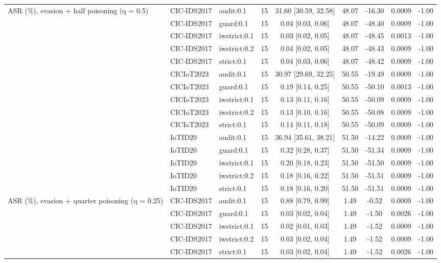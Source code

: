 \begin{table}[t]
\begin{tabular}{lllcccccc}
ASR (\%), evasion + half poisoning (q = 0.5) & CIC-IDS2017 & audit:0.1 & 15 & 31.60 [30.59, 32.58] & 48.07 & -16.30 & 0.0009 & -1.00 \\
 & CIC-IDS2017 & guard:0.1 & 15 & 0.04 [0.03, 0.06] & 48.07 & -48.40 & 0.0009 & -1.00 \\
 & CIC-IDS2017 & iwstrict:0.1 & 15 & 0.03 [0.02, 0.05] & 48.07 & -48.45 & 0.0013 & -1.00 \\
 & CIC-IDS2017 & iwstrict:0.2 & 15 & 0.04 [0.02, 0.05] & 48.07 & -48.43 & 0.0009 & -1.00 \\
 & CIC-IDS2017 & strict:0.1 & 15 & 0.04 [0.03, 0.06] & 48.07 & -48.42 & 0.0009 & -1.00 \\
 & CICIoT2023 & audit:0.1 & 15 & 30.97 [29.69, 32.25] & 50.55 & -19.49 & 0.0009 & -1.00 \\
 & CICIoT2023 & guard:0.1 & 15 & 0.19 [0.14, 0.25] & 50.55 & -50.10 & 0.0013 & -1.00 \\
 & CICIoT2023 & iwstrict:0.1 & 15 & 0.13 [0.11, 0.16] & 50.55 & -50.09 & 0.0009 & -1.00 \\
 & CICIoT2023 & iwstrict:0.2 & 15 & 0.13 [0.10, 0.16] & 50.55 & -50.08 & 0.0009 & -1.00 \\
 & CICIoT2023 & strict:0.1 & 15 & 0.14 [0.11, 0.18] & 50.55 & -50.09 & 0.0009 & -1.00 \\
 & IoTID20 & audit:0.1 & 15 & 36.94 [35.61, 38.21] & 51.50 & -14.22 & 0.0009 & -1.00 \\
 & IoTID20 & guard:0.1 & 15 & 0.32 [0.28, 0.37] & 51.50 & -51.34 & 0.0009 & -1.00 \\
 & IoTID20 & iwstrict:0.1 & 15 & 0.20 [0.18, 0.23] & 51.50 & -51.50 & 0.0009 & -1.00 \\
 & IoTID20 & iwstrict:0.2 & 15 & 0.18 [0.16, 0.22] & 51.50 & -51.51 & 0.0009 & -1.00 \\
 & IoTID20 & strict:0.1 & 15 & 0.18 [0.16, 0.20] & 51.50 & -51.51 & 0.0009 & -1.00 \\
ASR (\%), evasion + quarter poisoning (q = 0.25) & CIC-IDS2017 & audit:0.1 & 15 & 0.88 [0.79, 0.99] & 1.49 & -0.52 & 0.0009 & -1.00 \\
 & CIC-IDS2017 & guard:0.1 & 15 & 0.03 [0.02, 0.04] & 1.49 & -1.50 & 0.0026 & -1.00 \\
 & CIC-IDS2017 & iwstrict:0.1 & 15 & 0.02 [0.01, 0.03] & 1.49 & -1.52 & 0.0009 & -1.00 \\
 & CIC-IDS2017 & iwstrict:0.2 & 15 & 0.03 [0.02, 0.04] & 1.49 & -1.52 & 0.0009 & -1.00 \\
 & CIC-IDS2017 & strict:0.1 & 15 & 0.03 [0.02, 0.04] & 1.49 & -1.52 & 0.0026 & -1.00 \\

\end{tabular}
\end{table}
